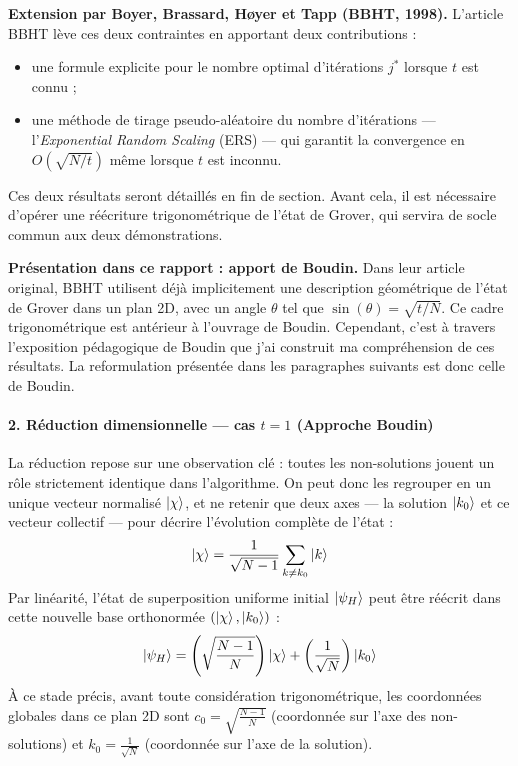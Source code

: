 \documentclass{ceri/sty/rapport}
\begin{document}
\medskip\noindent\textbf{Extension par Boyer, Brassard, Høyer et Tapp (BBHT, 1998).}
L'article BBHT lève ces deux contraintes en apportant deux contributions :
\begin{itemize}
  \item une formule explicite pour le nombre optimal d'itérations $j^*$ lorsque $t$ est connu ;
  \item une méthode de tirage pseudo-aléatoire du nombre d'itérations ---
        l'\emph{Exponential Random Scaling} (ERS) --- qui garantit la convergence
        en $O\!\left(\sqrt{N/t}\right)$ même lorsque $t$ est inconnu.
\end{itemize}
Ces deux résultats seront détaillés en fin de section. Avant cela, il est nécessaire d'opérer une réécriture trigonométrique de l'état de Grover, qui servira de socle commun aux deux démonstrations.

\medskip\noindent\textbf{Présentation dans ce rapport : apport de Boudin.}
Dans leur article original, BBHT utilisent déjà implicitement une description géométrique de l'état de Grover dans un plan 2D, avec un angle $\theta$ tel que $\sin(\theta) = \sqrt{t/N}$. Ce cadre trigonométrique est antérieur à l'ouvrage de Boudin. Cependant, c'est à travers l'exposition pédagogique de Boudin que j'ai construit ma compréhension de ces résultats. La reformulation présentée dans les paragraphes suivants est donc celle de Boudin.

\paragraph{2. Réduction dimensionnelle --- cas $t = 1$ (Approche Boudin)}
La réduction repose sur une observation clé : toutes les non-solutions jouent un rôle strictement identique dans l'algorithme. On peut donc les regrouper en un unique vecteur normalisé $\ket{\chi}$, et ne retenir que deux axes --- la solution $\ket{k_0}$ et ce vecteur collectif --- pour décrire l'évolution complète de l'état :
\[
\ket{\chi} = \frac{1}{\sqrt{N - 1}} \sum_{k \neq k_0} \ket{k}
\]
Par linéarité, l'état de superposition uniforme initial $\ket{\psi_H}$ peut être réécrit dans cette nouvelle base orthonormée $(\ket{\chi}, \ket{k_0})$ :
\[
\ket{\psi_H} = \left(\sqrt{\frac{N-1}{N}}\right)\ket{\chi} + \left(\frac{1}{\sqrt{N}}\right)\ket{k_0}
\]
À ce stade précis, avant toute considération trigonométrique, les coordonnées globales dans ce plan 2D sont $c_0 = \sqrt{\frac{N-1}{N}}$ (coordonnée sur l'axe des non-solutions) et $k_0 = \frac{1}{\sqrt{N}}$ (coordonnée sur l'axe de la solution). 
\end{document}
